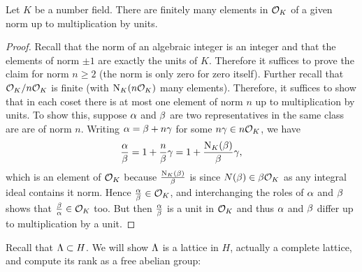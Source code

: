     \begin{lemma}\label{lem:finitely_many_elements_of_fixed_norm}
      Let $K$ be a number field. There are finitely many elements in $\mathcal{O}_{K}$ of a given norm up to multiplication by units.
    \end{lemma}
    \begin{proof}
      Recall that the norm of an algebraic integer is an integer and that the elements of norm $\pm1$ are exactly the units of $K$. Therefore it suffices to prove the claim for norm $n \ge 2$ (the norm is only zero for zero itself). Further recall that $\mathcal{O}_{K}/n\mathcal{O}_{K}$ is finite (with $\operatorname{\mathrm{N}}_{K}(n\mathcal{O}_{K})$ many elements). Therefore, it suffices to show that in each coset there is at most one element of norm $n$ up to multiplication by units. To show this, suppose $\alpha$ and $\beta$ are two representatives in the same class are are of norm $n$. Writing $\alpha = \beta+n\gamma$ for some $n\gamma \in n\mathcal{O}_{K}$, we have
      \[
        \frac{\alpha}{\beta} = 1+\frac{n}{\beta}\gamma = 1+\frac{\operatorname{\mathrm{N}}_{K}(\beta)}{\beta}\gamma,
      \]
      which is an element of $\mathcal{O}_{K}$ because $\frac{\operatorname{\mathrm{N}}_{K}(\beta)}{\beta}$ is since $N(\beta) \in \beta\mathcal{O}_{K}$ as any integral ideal contains it norm. Hence $\frac{\alpha}{\beta} \in \mathcal{O}_{K}$, and interchanging the roles of $\alpha$ and $\beta$ shows that $\frac{\beta}{\alpha} \in \mathcal{O}_{K}$ too. But then $\frac{\alpha}{\beta}$ is a unit in $\mathcal{O}_{K}$ and thus $\alpha$ and $\beta$ differ up to multiplication by a unit.
    \end{proof}

    Recall that $\Lambda \subset H$. We will show $\Lambda$ is a lattice in $H$, actually a complete lattice, and compute its rank as a free abelian group:

